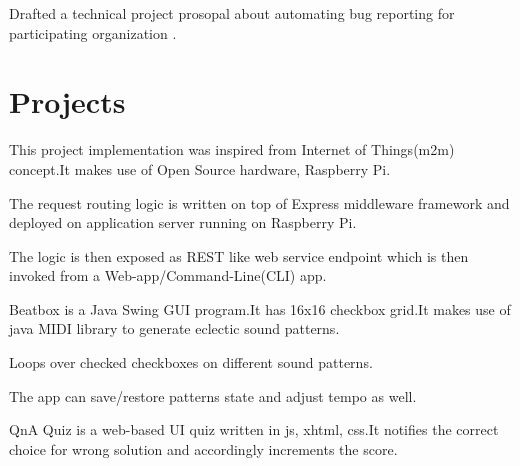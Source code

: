 \documentclass[hidelinks]{deedy-resume-openfont}
\renewcommand{\sectionsep}[0]{\vspace{8pt}}
\begin{document}
\begin{minipage}[t]{0.66\textwidth}
\begin{tightemize}
\item Drafted a technical project prosopal about automating bug reporting
  for participating organization \href{http://code.timvideos.us/home/}{}.
\end{tightemize}
\sectionsep


\section{Projects}
\descript{}
\begin{tightemize}
\item This project implementation was inspired from Internet of Things(m2m)
  concept.It makes use of Open Source hardware, Raspberry Pi.
\item The request routing logic is written on top of Express middleware
  framework and deployed on application server running on
  Raspberry Pi.
\item The logic is then exposed as REST like web service endpoint which is then
  invoked from a Web-app/Command-Line(CLI) app.
\end{tightemize}
\sectionsep

\descript{}
\begin{tightemize}
\item Beatbox is a Java Swing GUI program.It has 16x16 checkbox grid.It makes
  use of java MIDI library to generate eclectic sound patterns.
\item Loops over checked checkboxes on different sound patterns.
\item The app can save/restore patterns state and adjust tempo as well.
\end{tightemize}
\sectionsep

\descript{}
\begin{tightemize}
\item QnA Quiz is a web-based UI quiz written in js, xhtml, css.It notifies
  the correct choice for wrong solution and accordingly increments the score.
\end{tightemize}
\sectionsep


\end{minipage}
\end{document}

